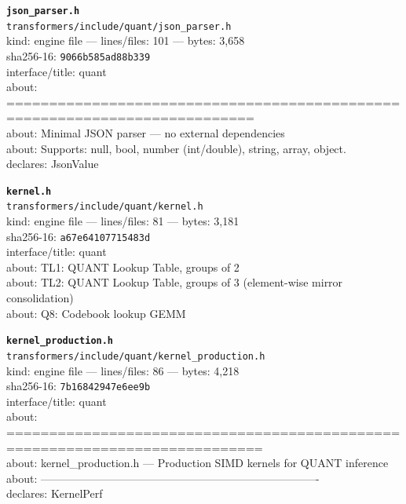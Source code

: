 \noindent\textbf{\texttt{json\_parser.h}}\\
\texttt{transformers/include/quant/json\_parser.h}\\
kind: engine file --- lines/files: 101 --- bytes: 3,658\\
sha256-16: \texttt{9066b585ad88b339}\\
interface/title: quant\\
about: ===========================================================================\\
about: Minimal JSON parser — no external dependencies\\
about: Supports: null, bool, number (int/double), string, array, object.\\
declares: JsonValue\\
\vspace*{6.0pt}

\noindent\textbf{\texttt{kernel.h}}\\
\texttt{transformers/include/quant/kernel.h}\\
kind: engine file --- lines/files: 81 --- bytes: 3,181\\
sha256-16: \texttt{a67e64107715483d}\\
interface/title: quant\\
about: TL1: QUANT Lookup Table, groups of 2\\
about: TL2: QUANT Lookup Table, groups of 3 (element-wise mirror consolidation)\\
about: Q8: Codebook lookup GEMM\\
\vspace*{6.0pt}
\newpage

\noindent\textbf{\texttt{kernel\_production.h}}\\
\texttt{transformers/include/quant/kernel\_production.h}\\
kind: engine file --- lines/files: 86 --- bytes: 4,218\\
sha256-16: \texttt{7b16842947e6ee9b}\\
interface/title: quant\\
about: ============================================================================\\
about: kernel\_production.h — Production SIMD kernels for QUANT inference\\
about: ----------------------------------------------------------------------------\\
declares: KernelPerf\\
\vspace*{6.0pt}

